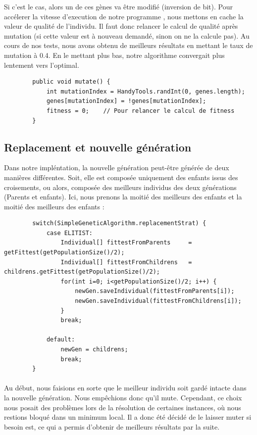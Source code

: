 		Si c'est le cas, alors un de ces gènes va être modifié (inversion de bit). Pour accélerer la vitesse d'execution de notre programme
, nous mettons en cache la valeur de qualité de l'individu. Il faut donc relancer le calcul de qualité après mutation (si cette valeur est
à nouveau demandé, sinon on ne la calcule pas). Au cours de nos tests, nous avons obtenu de meilleurs résultats en mettant le taux de mutation à 0.4.
En le mettant plus bas, notre algorithme convergait plus lentement vers l'optimal.

		\begin{lstlisting}
		public void mutate() {
			int mutationIndex = HandyTools.randInt(0, genes.length);
			genes[mutationIndex] = !genes[mutationIndex];
			fitness = 0;	// Pour relancer le calcul de fitness
		}
		\end{lstlisting}

	\subsection{Replacement et nouvelle génération}

	Dans notre impléntation, la nouvelle génération peut-être générée de deux manières différentes. Soit, elle est composée uniquement des
enfants issus des croisements, ou alors, composée des meilleurs individus des deux générations (Parents et enfants).
Ici, nous prenons la moitié des meilleurs des enfants et la moitié des meilleurs des enfants :

		\begin{lstlisting}
		switch(SimpleGeneticAlgorithm.replacementStrat) {
			case ELITIST:
				Individual[] fittestFromParents 	= getFittest(getPopulationSize()/2);
				Individual[] fittestFromChildrens 	= childrens.getFittest(getPopulationSize()/2);
				for(int i=0; i<getPopulationSize()/2; i++) {
					newGen.saveIndividual(fittestFromParents[i]);
					newGen.saveIndividual(fittestFromChildrens[i]);
				}
				break;

			default:
				newGen = childrens;
				break;
		}
		\end{lstlisting}

	\paragraph{}Au début, nous faisions en sorte que le meilleur individu soit gardé intacte dans la nouvelle génération. Nous empêchions donc qu'il
mute. Cependant, ce choix nous posait des problèmes lors de la résolution de certaines instances, où nous restions bloqué dans un minimum local.
Il a donc été décidé de le laisser muter si besoin est, ce qui a permis d'obtenir de meilleurs résultats par la suite.

